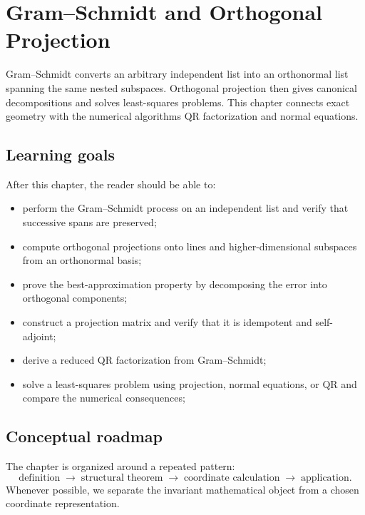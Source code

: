 \chapter{Gram–Schmidt and Orthogonal Projection}
\label{ch:i14-gram-schmidt-and-orthogonal-projection}

Gram–Schmidt converts an arbitrary independent list into an orthonormal list spanning the same nested subspaces. Orthogonal projection then gives canonical decompositions and solves least-squares problems. This chapter connects exact geometry with the numerical algorithms QR factorization and normal equations.

\section*{Learning goals}
After this chapter, the reader should be able to:
\begin{itemize}
\item perform the Gram--Schmidt process on an independent list and verify that successive spans are preserved;
\item compute orthogonal projections onto lines and higher-dimensional subspaces from an orthonormal basis;
\item prove the best-approximation property by decomposing the error into orthogonal components;
\item construct a projection matrix and verify that it is idempotent and self-adjoint;
\item derive a reduced QR factorization from Gram--Schmidt;
\item solve a least-squares problem using projection, normal equations, or QR and compare the numerical consequences;
\end{itemize}
\section*{Conceptual roadmap}
The chapter is organized around a repeated pattern:
\[
\boxed{\text{definition}\;\longrightarrow\;\text{structural theorem}\;\longrightarrow\;\text{coordinate calculation}\;\longrightarrow\;\text{application}.}
\]
Whenever possible, we separate the invariant mathematical object from a chosen coordinate representation.


